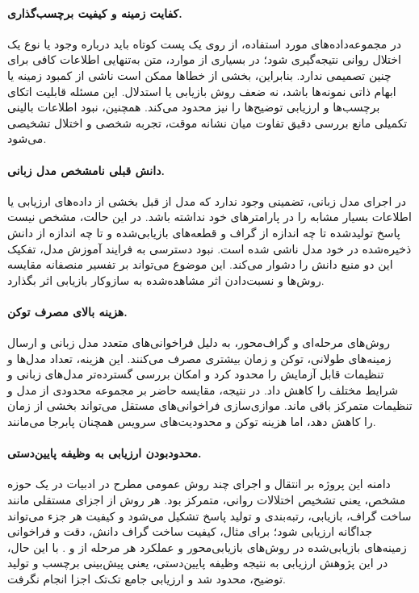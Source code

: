 \paragraph{کفایت زمینه و کیفیت برچسب‌گذاری.}
در مجموعه‌داده‌های مورد استفاده، از روی یک پست کوتاه باید درباره وجود یا نوع یک اختلال روانی نتیجه‌گیری شود؛ در بسیاری از موارد، متن به‌تنهایی اطلاعات کافی برای چنین تصمیمی ندارد. بنابراین، بخشی از خطاها ممکن است ناشی از کمبود زمینه یا ابهام ذاتی نمونه‌ها باشد، نه ضعف روش بازیابی یا استدلال. این مسئله قابلیت اتکای برچسب‌ها و ارزیابی توضیح‌ها را نیز محدود می‌کند. همچنین، نبود اطلاعات بالینی تکمیلی مانع بررسی دقیق تفاوت میان نشانه موقت، تجربه شخصی و اختلال تشخیصی می‌شود.

\paragraph{دانش قبلی نامشخص مدل زبانی.}
در اجرای مدل زبانی، تضمینی وجود ندارد که مدل از قبل بخشی از داده‌های ارزیابی یا اطلاعات بسیار مشابه را در پارامترهای خود نداشته باشد. در این حالت، مشخص نیست پاسخ تولیدشده تا چه اندازه از گراف و قطعه‌های بازیابی‌شده و تا چه اندازه از دانش ذخیره‌شده در خود مدل ناشی شده است. نبود دسترسی به فرایند آموزش مدل، تفکیک این دو منبع دانش را دشوار می‌کند. این موضوع می‌تواند بر تفسیر منصفانه مقایسه روش‌ها و نسبت‌دادن اثر مشاهده‌شده به سازوکار بازیابی اثر بگذارد.

\paragraph{هزینه بالای مصرف توکن.}
روش‌های مرحله‌ای و گراف‌محور، به دلیل فراخوانی‌های متعدد مدل زبانی و ارسال زمینه‌های طولانی، توکن و زمان بیشتری مصرف می‌کنند. این هزینه، تعداد مدل‌ها و تنظیمات قابل آزمایش را محدود کرد و امکان بررسی گسترده‌تر مدل‌های زبانی و شرایط مختلف را کاهش داد. در نتیجه، مقایسه حاضر بر مجموعه محدودی از مدل و تنظیمات متمرکز باقی ماند. موازی‌سازی فراخوانی‌های مستقل می‌تواند بخشی از زمان را کاهش دهد، اما هزینه توکن و محدودیت‌های سرویس همچنان پابرجا می‌مانند.

\paragraph{محدودبودن ارزیابی به وظیفه پایین‌دستی.}
دامنه این پروژه بر انتقال و اجرای چند روش عمومی مطرح در ادبیات در یک حوزه مشخص، یعنی تشخیص اختلالات روانی، متمرکز بود. هر روش از اجزای مستقلی مانند ساخت گراف، بازیابی، رتبه‌بندی و تولید پاسخ تشکیل می‌شود و کیفیت هر جزء می‌تواند جداگانه ارزیابی شود؛ برای مثال، کیفیت ساخت گراف دانش، دقت و فراخوانی زمینه‌های بازیابی‌شده در روش‌های بازیابی‌محور و عملکرد هر مرحله از  و . با این حال، در این پژوهش ارزیابی به نتیجه وظیفه پایین‌دستی، یعنی پیش‌بینی برچسب و تولید توضیح، محدود شد و ارزیابی جامع تک‌تک اجزا انجام نگرفت.

